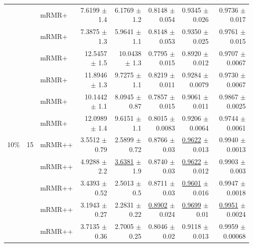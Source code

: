 \begin{longtable}{llp{}rrrrr}
 &  & mRMR+ & 7.6199 {\scriptsize $\pm$ 1.4} & 6.1769 {\scriptsize $\pm$ 1.2} & 0.8148 {\scriptsize $\pm$ 0.054} & 0.9345 {\scriptsize $\pm$ 0.026} & 0.9736 {\scriptsize $\pm$ 0.017} \\
 &  & mRMR+ & 7.3875 {\scriptsize $\pm$ 1.3} & 5.9641 {\scriptsize $\pm$ 1.1} & 0.8148 {\scriptsize $\pm$ 0.053} & 0.9350 {\scriptsize $\pm$ 0.025} & 0.9761 {\scriptsize $\pm$ 0.015} \\
 &  & mRMR+ & 12.5457 {\scriptsize $\pm$ 1.5} & 10.0438 {\scriptsize $\pm$ 1.3} & 0.7795 {\scriptsize $\pm$ 0.015} & 0.8920 {\scriptsize $\pm$ 0.012} & 0.9707 {\scriptsize $\pm$ 0.0067} \\
 &  & mRMR+ & 11.8946 {\scriptsize $\pm$ 1.3} & 9.7275 {\scriptsize $\pm$ 1.1} & 0.8219 {\scriptsize $\pm$ 0.011} & 0.9284 {\scriptsize $\pm$ 0.0079} & 0.9730 {\scriptsize $\pm$ 0.0067} \\
 &  & mRMR+ & 10.1442 {\scriptsize $\pm$ 1.1} & 8.0945 {\scriptsize $\pm$ 0.87} & 0.7857 {\scriptsize $\pm$ 0.015} & 0.9061 {\scriptsize $\pm$ 0.011} & 0.9867 {\scriptsize $\pm$ 0.0025} \\
 &  & mRMR+ & 12.0989 {\scriptsize $\pm$ 1.4} & 9.6151 {\scriptsize $\pm$ 1.1} & 0.8015 {\scriptsize $\pm$ 0.0083} & 0.9206 {\scriptsize $\pm$ 0.0064} & 0.9744 {\scriptsize $\pm$ 0.0061} \\
\midrule
10\% & 15 & mRMR++ & 3.5512 {\scriptsize $\pm$ 0.79} & 2.5899 {\scriptsize $\pm$ 0.72} & 0.8766 {\scriptsize $\pm$ 0.03} & \underline{0.9622} {\scriptsize $\pm$ 0.013} & 0.9940 {\scriptsize $\pm$ 0.0013} \\
 &  & mRMR++ & 4.9288 {\scriptsize $\pm$ 2.2} & \underline{3.6381} {\scriptsize $\pm$ 1.9} & 0.8740 {\scriptsize $\pm$ 0.03} & \underline{0.9622} {\scriptsize $\pm$ 0.012} & 0.9903 {\scriptsize $\pm$ 0.003} \\
 &  & mRMR++ & 3.4393 {\scriptsize $\pm$ 0.52} & 2.5013 {\scriptsize $\pm$ 0.5} & 0.8711 {\scriptsize $\pm$ 0.03} & \underline{0.9601} {\scriptsize $\pm$ 0.016} & 0.9947 {\scriptsize $\pm$ 0.0018} \\
 &  & mRMR++ & 3.1943 {\scriptsize $\pm$ 0.27} & 2.2831 {\scriptsize $\pm$ 0.22} & \underline{0.8902} {\scriptsize $\pm$ 0.024} & \underline{0.9699} {\scriptsize $\pm$ 0.01} & \underline{0.9951} {\scriptsize $\pm$ 0.0024} \\
 &  & mRMR++ & 3.7135 {\scriptsize $\pm$ 0.36} & 2.7005 {\scriptsize $\pm$ 0.25} & 0.8046 {\scriptsize $\pm$ 0.02} & 0.9118 {\scriptsize $\pm$ 0.013} & 0.9959 {\scriptsize $\pm$ 0.00068} \\

\end{longtable}
